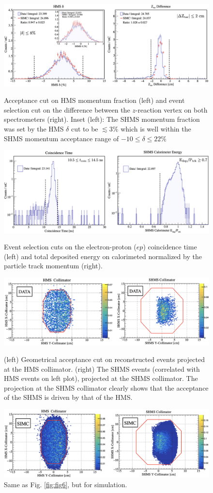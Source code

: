 \documentclass[aps, prl]{revtex4-2}  %
\begin{document}
\begin{figure}
\includegraphics[scale=0.33]{plots/deltaAcc_and_ZtarCUT_80MeV_35deg.png}
\caption{Acceptance cut on HMS momentum fraction (left) and event selection cut on the difference between the $z$-reaction vertex on both spectrometers (right).
  Inset (left): The SHMS momentum fraction was set by the HMS $\delta$ cut to be $\lesssim$3$\%$ which is well within the SHMS momentum acceptance range of $-10 \leq \delta \leq22 \%$}
\label{fig:fig4}
\includegraphics[scale=0.30]{plots/coin_and_eCal_CUT_80MeV_35deg.png}
\caption{Event selection cuts on the electron-proton ($ep$) coincidence time (left) and total deposited energy on calorimeted normalized by the particle track momentum (right).}
\label{fig:fig5}
\includegraphics[scale=0.30]{plots/collimator_CUT_80MeV_35deg_data.png}
\caption{(left) Geometrical acceptance cut on reconstructed events projected at the HMS collimator. (right) The SHMS events (correlated with HMS events on left plot), projected at the SHMS collimator.
  The projection at the SHMS collimator clearly shows that the acceptance of the SHMS is driven by that of the HMS.}
\label{fig:fig6}
\includegraphics[scale=0.30]{plots/collimator_CUT_80MeV_35deg_SIMC.png}
\caption{Same as Fig. \ref{fig:fig6}, but for simulation.}
\label{fig:fig7}
\end{figure}
\clearpage
\end{document}
